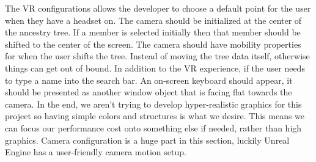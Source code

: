 \documentclass[onecolumn, draftclsnofoot, 10pt, compsoc]{IEEEtran}
\begin{document}
\begin{singlespace}
\newline
\newline
The VR configurations allows the developer to choose a default point for the user when they have a headset on. The camera should be initialized at the center of the ancestry tree. If a member is selected initially then that member should be shifted to the center of the screen. The camera should have mobility properties for when the user shifts the tree. Instead of moving the tree data itself, otherwise things can get out of bound.
\newline
\newline
In addition to the VR experience, if the user needs to type a name into the search bar. An on-screen keyboard should appear, it should be presented as another window object that is facing flat towards the camera. 
\newline
\newline
In the end, we aren’t trying to develop hyper-realistic graphics for this project so having simple colors and structures is what we desire. This means we can focus our performance cost onto something else if needed, rather than high graphics. Camera configuration is a huge part in this section, luckily Unreal Engine has a user-friendly camera motion setup.

\end{singlespace}
\end{document}
